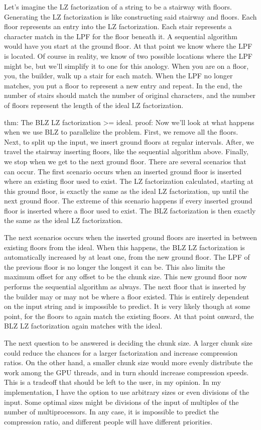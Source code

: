 Let's imagine the LZ factorization of a string to be a stairway with floors.
Generating the LZ factorization is like constructing said stairway and floors.
Each floor represents an entry into the LZ factorization.
Each stair represents a character match in the LPF for the floor beneath it.
A sequential algorithm would have you start at the ground floor.
At that point we know where the LPF is located.
Of course in reality, we know of two possible locations where the LPF might be, but we'll simplify it to one for this anology.
When you are on a floor, you, the builder, walk up a stair for each match.
When the LPF no longer matches, you put a floor to represent a new entry and repeat.
In the end, the number of stairs should match the number of original characters, and the number of floors represent the length of the ideal LZ factorization.

thm: The BLZ LZ factorization >= ideal.
proof:
Now we'll look at what happens when we use BLZ to parallelize the problem.
First, we remove all the floors.
Next, to split up the input, we insert ground floors at regular intervals.
After, we travel the stairway inserting floors, like the sequential algorithm above.
Finally, we stop when we get to the next ground floor.
There are several scenarios that can occur.
The first scenario occurs when an inserted ground floor is inserted where an existing floor used to exist.
The LZ factorization calculated, starting at this ground floor, is exactly the same as the ideal LZ factorization, up until the next ground floor.
The extreme of this scenario happens if every inserted ground floor is inserted where a floor used to exist.
The BLZ factorization is then exactly the same as the ideal LZ factorization.

The next scenarios occurs when the inserted ground floors are inserted in between existing floors from the ideal.
When this happens, the BLZ LZ factorization is automatically increased by at least one, from the new ground floor.
The LPF of the previous floor is no longer the longest it can be.
This also limits the maximum offset for any offset to be the chunk size.
This new ground floor now performs the sequential algorithm as always.
The next floor that is inserted by the builder may or may not be where a floor existed.
This is entirely dependent on the input string and is impossible to predict.
It is very likely though at some point, for the floors to again match the existing floors.
At that point onward, the BLZ LZ factorization again matches with the ideal.

The next question to be answered is deciding the chunk size. 
A larger chunk size could reduce the chances for a larger factorization and increase compression ratios.
On the other hand, a smaller chunk size would more evenly distribute the work among the GPU threads, and in turn should increase compression speeds.
This is a tradeoff that should be left to the user, in my opinion.
In my implementation, I have the option to use arbitrary sizes or even divisions of the input.
Some optimal sizes might be divisions of the input of multiples of the number of multiprocessors.
In any case, it is impossible to predict the compression ratio, and different people will have different priorities.

